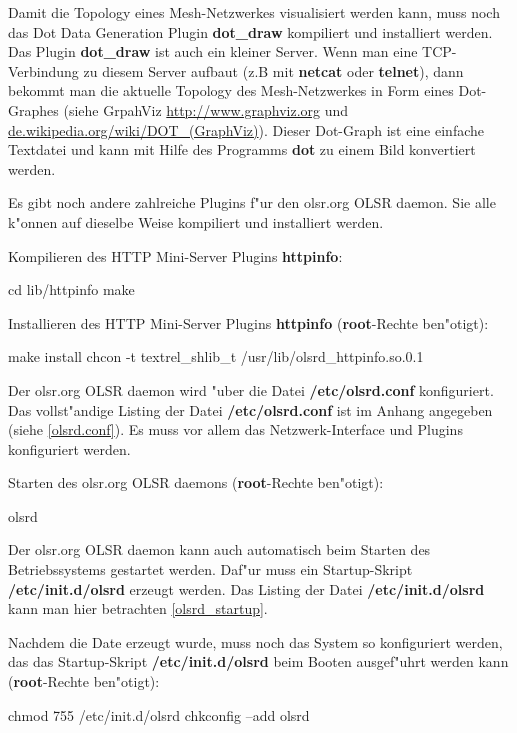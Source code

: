 Damit die Topology eines Mesh-Netzwerkes visualisiert werden kann,
muss noch das Dot Data Generation Plugin \textbf{dot\_draw}
kompiliert und installiert werden. Das Plugin \textbf{dot\_draw}
ist auch ein kleiner Server. Wenn man eine TCP-Verbindung zu diesem Server
aufbaut (z.B mit \textbf{netcat} oder \textbf{telnet}),
dann bekommt man die aktuelle Topology des Mesh-Netzwerkes in
Form eines Dot-Graphes
(siehe GrpahViz \url{http://www.graphviz.org} und
 \url{de.wikipedia.org/wiki/DOT\_(GraphViz)}).
Dieser Dot-Graph ist eine einfache Textdatei und kann mit Hilfe des
Programms \textbf{dot} zu einem Bild konvertiert werden.

Es gibt noch andere zahlreiche Plugins f"ur
den olsr.org OLSR daemon. Sie alle k"onnen auf dieselbe Weise kompiliert
und installiert werden.

Kompilieren des HTTP Mini-Server Plugins \textbf{httpinfo}:
\begin{shelllst}
cd lib/httpinfo
make
\end{shelllst}

Installieren des HTTP Mini-Server Plugins \textbf{httpinfo}
(\textbf{root}-Rechte ben"otigt):
\begin{shelllst}
make install 
chcon -t textrel_shlib_t /usr/lib/olsrd_httpinfo.so.0.1
\end{shelllst}

Der olsr.org OLSR daemon wird "uber die Datei \textbf{/etc/olsrd.conf}
konfiguriert.  Das vollst"andige Listing der Datei \textbf{/etc/olsrd.conf} ist
im Anhang angegeben (siehe \ref{olsrd.conf}).
Es muss vor allem das Netzwerk-Interface und Plugins konfiguriert werden.

Starten des olsr.org OLSR daemons
(\textbf{root}-Rechte ben"otigt):
\begin{shelllst}
olsrd
\end{shelllst}

Der olsr.org OLSR daemon kann auch automatisch beim Starten
des Betriebssystems gestartet werden. Daf"ur muss ein Startup-Skript
\textbf{/etc/init.d/olsrd} erzeugt werden. Das Listing der Datei
\textbf{/etc/init.d/olsrd} kann man hier betrachten \ref{olsrd_startup}.

Nachdem die Date erzeugt wurde, muss noch das System so konfiguriert
werden, das das Startup-Skript \textbf{/etc/init.d/olsrd} beim Booten
ausgef"uhrt werden kann (\textbf{root}-Rechte ben"otigt):
\begin{shelllst}
chmod 755 /etc/init.d/olsrd
chkconfig --add olsrd
\end{shelllst}

